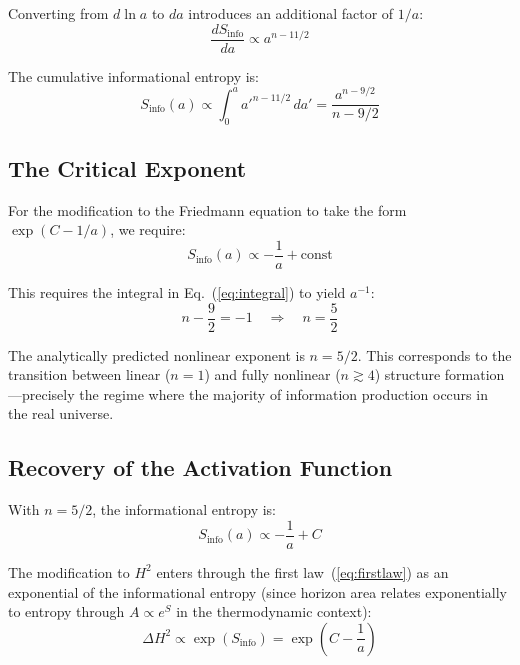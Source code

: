 \documentclass[twocolumn,superscriptaddress,prl,amsmath,amssymb]{revtex4-2}
\begin{document}
Converting from $d\ln a$ to $da$ introduces an additional factor of $1/a$:
\begin{equation}
\frac{dS_\text{info}}{da} \propto a^{n - 11/2}
\end{equation}

The cumulative informational entropy is:
\begin{equation}
S_\text{info}(a) \propto \int_0^a a'^{n-11/2} \, da' = \frac{a^{n-9/2}}{n - 9/2}
\label{eq:integral}
\end{equation}

\subsection{The Critical Exponent}

For the modification to the Friedmann equation to take the form $\exp(C - 1/a)$, we require:
\begin{equation}
S_\text{info}(a) \propto -\frac{1}{a} + \text{const}
\end{equation}

This requires the integral in Eq.~(\ref{eq:integral}) to yield $a^{-1}$:
\begin{equation}
n - \frac{9}{2} = -1 \quad \Longrightarrow \quad \boxed{n = \frac{5}{2}}
\label{eq:critical_n}
\end{equation}

The analytically predicted nonlinear exponent is $n = 5/2$. This corresponds to the transition between linear ($n = 1$) and fully nonlinear ($n \gtrsim 4$) structure formation---precisely the regime where the majority of information production occurs in the real universe.

\subsection{Recovery of the Activation Function}

With $n = 5/2$, the informational entropy is:
\begin{equation}
S_\text{info}(a) \propto -\frac{1}{a} + C
\end{equation}

The modification to $H^2$ enters through the first law~(\ref{eq:firstlaw}) as an exponential of the informational entropy (since horizon area relates exponentially to entropy through $A \propto e^{S}$ in the thermodynamic context):
\begin{equation}
\Delta H^2 \propto \exp(S_\text{info}) = \exp\left(C - \frac{1}{a}\right)
\end{equation}
\end{document}

